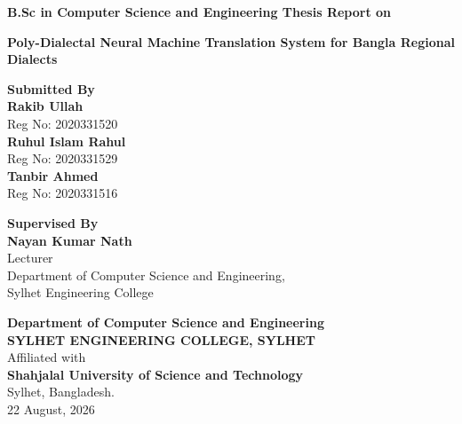\documentclass[12pt,a4paper]{article}
\begin{document}
\begin{titlepage}
    \centering
    
    \vspace*{1cm}
    
    \Large
    \textbf{B.Sc in Computer Science and Engineering Thesis Report on}
    
    \vspace{1.5cm}
    
    \Huge
    \textbf{Poly-Dialectal Neural Machine Translation System for Bangla Regional Dialects}
    
    \vspace{2cm}
    
    \Large
    \textbf{Submitted By}\\
    \vspace{0.5cm}
    \large
    \textbf{Rakib Ullah} \\
    Reg No: 2020331520 \\
    \vspace{0.3cm}
    \textbf{Ruhul Islam Rahul} \\
    Reg No: 2020331529 \\
    \vspace{0.3cm}
    \textbf{Tanbir Ahmed} \\
    Reg No: 2020331516 \\
    
    \vspace{2cm}
    
    \Large
    \textbf{Supervised By}\\
    \vspace{0.5cm}
    \large
    \textbf{Nayan Kumar Nath} \\
    Lecturer \\
    Department of Computer Science and Engineering, \\
    Sylhet Engineering College \\
    
    \vfill
    
    \Large
    \textbf{Department of Computer Science and Engineering}\\
    \vspace{0.2cm}
    \LARGE
    \textbf{SYLHET ENGINEERING COLLEGE, SYLHET}\\
    \vspace{0.5cm}
    \large
    Affiliated with\\
    \Large
    \textbf{Shahjalal University of Science and Technology}\\
    \large
    Sylhet, Bangladesh.\\
    \vspace{0.8cm}
    \large
    22 August, 2026
    
\end{titlepage}
\end{document}
